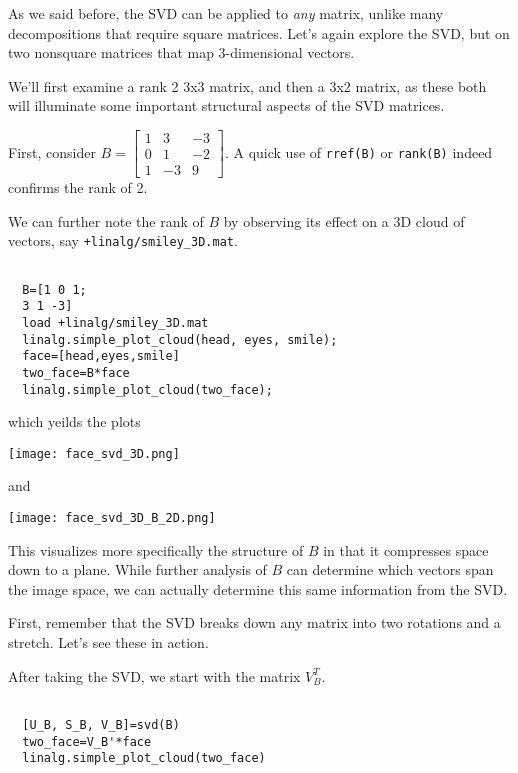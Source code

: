 \documentclass{ximera}
\begin{document}
As we said before, the SVD can be applied to \emph{any} matrix, unlike many decompositions that require square matrices. Let's again explore the SVD, but on two nonsquare matrices that map $3$-dimensional vectors.

We'll first examine a rank 2 3x3 matrix, and then a 3x2 matrix, as these both will illuminate some important structural aspects of the SVD matrices. 

First, consider $B=\begin{bmatrix}1&3&-3\\0&1&-2\\1&-3&9\end{bmatrix}$. A quick use of \texttt{rref(B)} or \texttt{rank(B)} indeed confirms the rank of 2. 

We can further note the rank of $B$ by observing its effect on a $3$D cloud of vectors, say \texttt{+linalg/smiley\_3D.mat}. 

\begin{verbatim}

  B=[1 0 1;
  3 1 -3]
  load +linalg/smiley_3D.mat
  linalg.simple_plot_cloud(head, eyes, smile);
  face=[head,eyes,smile]
  two_face=B*face
  linalg.simple_plot_cloud(two_face);
\end{verbatim}

which yeilds the plots 

\begin{center}
  \texttt{[image: face\_svd\_3D.png]}
\end{center}

    and 

\begin{center}
  \texttt{[image: face\_svd\_3D\_B\_2D.png]}
\end{center}

This visualizes more specifically the structure of $B$ in that it compresses space down to a plane. While further analysis of $B$ can determine which vectors span the image space, we can actually determine this same information from the SVD. 

First, remember that the SVD breaks down any matrix into two rotations and a stretch. Let's see these in action.

After taking the SVD, we start with the matrix $V_B^T$.

\begin{verbatim}

  [U_B, S_B, V_B]=svd(B)
  two_face=V_B'*face
  linalg.simple_plot_cloud(two_face)

\end{verbatim}
\end{document}
